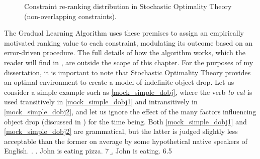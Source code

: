 \begin{figure}[htb]
\caption{Constraint re-ranking distribution in Stochastic Optimality Theory (non-overlapping constraints).}
\end{figure}

The Gradual Learning Algorithm uses these premises to assign an empirically motivated ranking value to each constraint, modulating its outcome based on an error-driven procedure. The full details of how the algorithm works, which the reader will find in \textcite{BoersmaHayes2001empirical}, are outside the scope of this chapter. For the purposes of my dissertation, it is important to note that Stochastic Optimality Theory provides an optimal environment to create a model of indefinite object drop. Let us consider a simple example such as \ref{mock_simple_dobj}, where the verb \textit{to eat} is used transitively in \ref{mock_simple_dobj1} and intransitively in \ref{mock_simple_dobj2}, and let us ignore the effect of the many factors influencing object drop (discussed in ) for the time being. Both \ref{mock_simple_dobj1} and \ref{mock_simple_dobj2} are grammatical, but the latter is judged slightly less acceptable than the former on average by some hypothetical native speakers of English.
\ex. \label{mock_simple_dobj} \a. \label{mock_simple_dobj1} John is eating pizza. \hfill 7
\b. \label{mock_simple_dobj2} John is eating. \hfill 6.5

